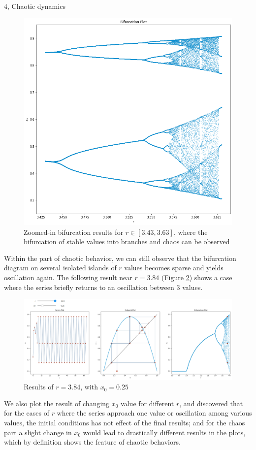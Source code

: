 \documentclass[10pt,a4paper]{article}
\begin{document}
\begin{task}{4, Chaotic dynamics}
\begin{figure} [H]
    \centering
    \includegraphics[width=.64\textwidth]{images/task4-1 zoom.png}
    \caption{Zoomed-in bifurcation results for $r\in[3.43, 3.63]$, where the bifurcation of stable values into branches and chaos can be observed}
    \label{fig:task4-1-zoom}
\end{figure}

Within the part of chaotic behavior, we can still observe that the bifurcation diagram on several isolated islands of $r$ values becomes sparse and yields oscillation again. The following result near $r=3.84$ (Figure \ref{fig:task4-1-3}) shows a case where the series briefly returns to an oscillation between 3 values.

\begin{figure} [H]
    \centering
    \includegraphics[width=.7\textwidth]{images/task4-1 (7).png}
    \caption{Results of $r=3.84$, with $x_0=0.25$}
    \label{fig:task4-1-3}
\end{figure}

We also plot the result of changing $x_0$ value for different $r$, and discovered that for the cases of $r$ where the series approach one value or oscillation among various values, the initial conditions has not effect of the final results; and for the chaos part a slight change in $x_0$ would lead to drastically different results in the plots, which by definition shows the feature of chaotic behaviors.


\end{task}
\end{document}
